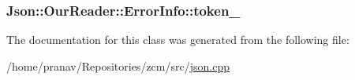 \subsubsection[{\texorpdfstring{token\+\_\+}{token_}}]{ Json\+::\+Our\+Reader\+::\+Error\+Info\+::token\+\_\+}\hypertarget{classJson_1_1OurReader_1_1ErrorInfo_ad05204ecabe5e7201a842935b874ae9a}{}\label{classJson_1_1OurReader_1_1ErrorInfo_ad05204ecabe5e7201a842935b874ae9a}


The documentation for this class was generated from the following file\+:\begin{DoxyCompactItemize}
\item 
/home/pranav/\+Repositories/zcm/src/\hyperlink{json_8cpp}{json.\+cpp}\end{DoxyCompactItemize}
